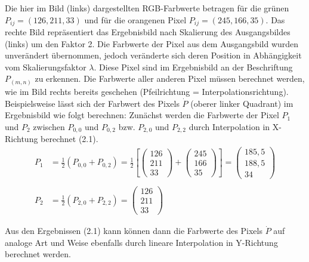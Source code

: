 \documentclass[
fontsize=10pt, 
listof = totoc,
parskip = half	
]{report}
\begin{document}
\noindent Die hier im Bild (links) dargestellten RGB-Farbwerte betragen für die grünen $P_{ij} = (126, 211, 33)$ und für die orangenen Pixel $P_{ij} = (245, 166, 35)$. Das rechte Bild repräsentiert das Ergebnisbild nach Skalierung des Ausgangsbildes (links) um den Faktor 2. Die Farbwerte der Pixel aus dem Ausgangsbild wurden unverändert übernommen, jedoch veränderte sich deren Position in Abhängigkeit vom Skalierungsfaktor $\lambda$. 
Diese Pixel sind im Ergebnisbild an der Beschriftung $P_{(m,n)}$ zu erkennen. Die Farbwerte aller anderen Pixel müssen berechnet werden, wie im Bild rechts bereits geschehen (Pfeilrichtung = Interpolationsrichtung). Beispielsweise lässt sich der Farbwert des Pixels $\dot{P}$ (oberer linker Quadrant) im Ergebnisbild wie folgt berechnen:
\newpage
\noindent Zunächst werden die Farbwerte der Pixel $P_1$ und $P_2$ zwischen $P_{0,0}$ und $P_{0,2}$ bzw. $P_{2,0}$ und $P_{2,2}$ durch Interpolation in X-Richtung berechnet (2.1).
\begin{equation}
	\begin{split}
		P_1	&=	\frac{1}{2} \left(P_{0,0} + P_{0,2}\right) =
				\frac{1}{2}
				\left[
				\begin{pmatrix}
					126\\
					211\\
					33
				\end{pmatrix}
				+
				\begin{pmatrix}
					245\\
					166\\
					35
				\end{pmatrix}
				\right]
				=
				\begin{pmatrix}
					185,5\\
					188,5\\
					34
				\end{pmatrix} \\\\
		P_2	&=	\frac{1}{2} \left(P_{2,0} + P_{2,2}\right) =
				\begin{pmatrix}
					126\\
					211\\
					33
				\end{pmatrix}
	\end{split}
\end{equation}

\noindent Aus den Ergebnissen (2.1) kann können dann die Farbwerte des Pixels $\dot{P}$ auf analoge Art und Weise ebenfalls durch lineare Interpolation in Y-Richtung berechnet werden.
\end{document}
